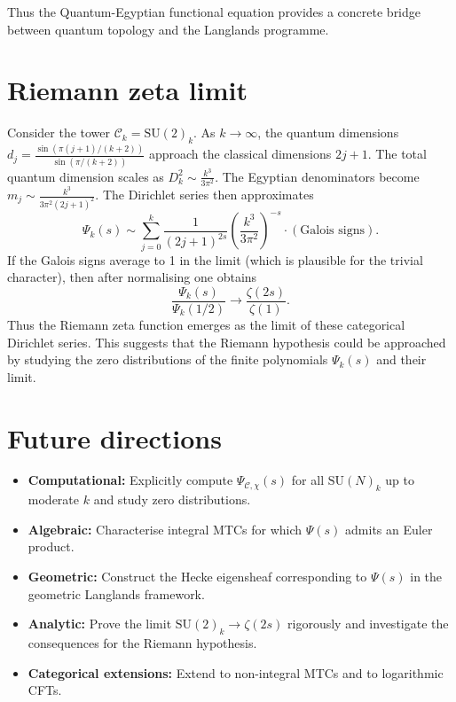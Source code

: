 \documentclass[12pt,a4paper]{article}
\theoremstyle{definition}
\theoremstyle{remark}
\begin{document}
Thus the Quantum-Egyptian functional equation provides a concrete bridge between
quantum topology and the Langlands programme.


\section{Riemann zeta limit}

Consider the tower $\mathcal{C}_k = \mathrm{SU}(2)_k$. As $k\to\infty$, the
quantum dimensions
$d_j = \frac{\sin(\pi(j+1)/(k+2))}{\sin(\pi/(k+2))}$ approach the classical
dimensions $2j+1$. The total quantum dimension scales as
$D_k^2 \sim \frac{k^3}{3\pi^2}$. The Egyptian denominators become
$m_j \sim \frac{k^3}{3\pi^2 (2j+1)^2}$. The Dirichlet series then approximates
\[
\Psi_k(s) \sim \sum_{j=0}^{k} \frac{1}{(2j+1)^{2s}}
  \left(\frac{k^3}{3\pi^2}\right)^{-s} \cdot (\text{Galois signs}).
\]
If the Galois signs average to 1 in the limit (which is plausible for the trivial
character), then after normalising one obtains
\[
\frac{\Psi_k(s)}{\Psi_k(1/2)} \longrightarrow \frac{\zeta(2s)}{\zeta(1)}.
\]
Thus the Riemann zeta function emerges as the limit of these categorical Dirichlet
series. This suggests that the Riemann hypothesis could be approached by studying
the zero distributions of the finite polynomials $\Psi_k(s)$ and their limit.


\section{Future directions}

\begin{itemize}
  \item \textbf{Computational:} Explicitly compute
    $\Psi_{\mathcal{C},\chi}(s)$ for all $\mathrm{SU}(N)_k$ up to moderate $k$
    and study zero distributions.
  \item \textbf{Algebraic:} Characterise integral MTCs for which $\Psi(s)$ admits
    an Euler product.
  \item \textbf{Geometric:} Construct the Hecke eigensheaf corresponding to
    $\Psi(s)$ in the geometric Langlands framework.
  \item \textbf{Analytic:} Prove the limit $\mathrm{SU}(2)_k \to \zeta(2s)$
    rigorously and investigate the consequences for the Riemann hypothesis.
  \item \textbf{Categorical extensions:} Extend to non-integral MTCs and to
    logarithmic CFTs.
\end{itemize}
\end{document}
